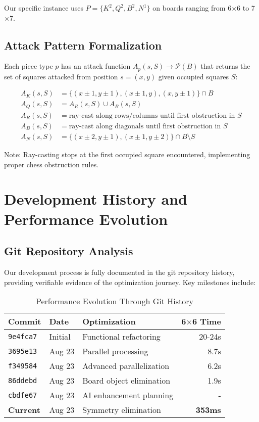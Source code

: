 \documentclass[12pt,a4paper]{article}
\theoremstyle{definition}
\begin{document}
Our specific instance uses $P = \{K^2, Q^2, B^2, N^1\}$ on boards ranging from 6$\times$6 to 7$\times$7.

\subsection{Attack Pattern Formalization}

Each piece type $p$ has an attack function $A_p(s, S) \rightarrow \mathcal{P}(B)$ that returns the set of squares attacked from position $s=(x,y)$ given occupied squares $S$:

\begin{align}
A_K(s, S) &= \{(x \pm 1, y \pm 1), (x \pm 1, y), (x, y \pm 1)\} \cap B \\
A_Q(s, S) &= A_R(s, S) \cup A_B(s, S) \\
A_R(s, S) &= \text{ray-cast along rows/columns until first obstruction in } S \\
A_B(s, S) &= \text{ray-cast along diagonals until first obstruction in } S \\
A_N(s, S) &= \{(x \pm 2, y \pm 1), (x \pm 1, y \pm 2)\} \cap B \setminus S
\end{align}

Note: Ray-casting stops at the first occupied square encountered, implementing proper chess obstruction rules.

\section{Development History and Performance Evolution}

\subsection{Git Repository Analysis}

Our development process is fully documented in the git repository history, providing verifiable evidence of the optimization journey. Key milestones include:

\begin{table}[h]
\centering
\caption{Performance Evolution Through Git History}
\begin{tabular}{@{}lllr@{}}
\toprule
Commit & Date & Optimization & 6$\times$6 Time \\
\midrule
\texttt{9e4fca7} & Initial & Functional refactoring & 20-24s \\
\texttt{3695e13} & Aug 23 & Parallel processing & 8.7s \\
\texttt{f349584} & Aug 23 & Advanced parallelization & 6.2s \\
\texttt{86ddebd} & Aug 23 & Board object elimination & 1.9s \\
\texttt{cbdfe67} & Aug 23 & AI enhancement planning & - \\
\textbf{Current} & Aug 23 & Symmetry elimination & \textbf{353ms} \\
\bottomrule
\end{tabular}
\end{table}
\end{document}
